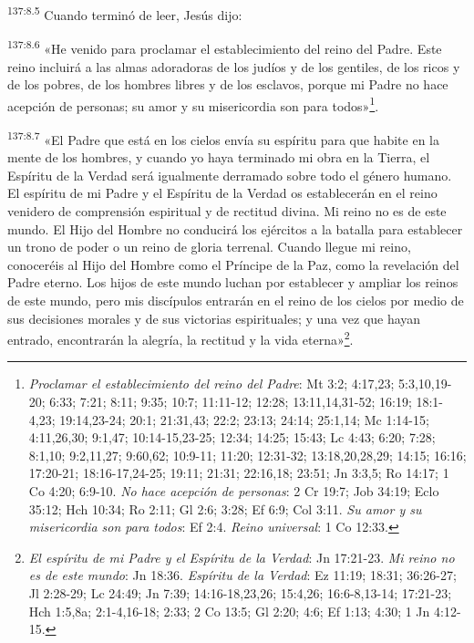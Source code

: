 \par 
\textsuperscript{137:8.5} Cuando terminó de leer, Jesús dijo:

\par 
\textsuperscript{137:8.6} «He venido para proclamar el establecimiento del reino del Padre. Este reino incluirá a las almas adoradoras de los judíos y de los gentiles, de los ricos y de los pobres, de los hombres libres y de los esclavos, porque mi Padre no hace acepción de personas; su amor y su misericordia son para todos»\footnote{\textit{Proclamar el establecimiento del reino del Padre}: Mt 3:2; 4:17,23; 5:3,10,19-20; 6:33; 7:21; 8:11; 9:35; 10:7; 11:11-12; 12:28; 13:11,14,31-52; 16:19; 18:1-4,23; 19:14,23-24; 20:1; 21:31,43; 22:2; 23:13; 24:14; 25:1,14; Mc 1:14-15; 4:11,26,30; 9:1,47; 10:14-15,23-25; 12:34; 14:25; 15:43; Lc 4:43; 6:20; 7:28; 8:1,10; 9:2,11,27; 9:60,62; 10:9-11; 11:20; 12:31-32; 13:18,20,28,29; 14:15; 16:16; 17:20-21; 18:16-17,24-25; 19:11; 21:31; 22:16,18; 23:51; Jn 3:3,5; Ro 14:17; 1 Co 4:20; 6:9-10. \textit{No hace acepción de personas}: 2 Cr 19:7; Job 34:19; Eclo 35:12; Hch 10:34; Ro 2:11; Gl 2:6; 3:28; Ef 6:9; Col 3:11. \textit{Su amor y su misericordia son para todos}: Ef 2:4. \textit{Reino universal}: 1 Co 12:33.}.

\par 
\textsuperscript{137:8.7} «El Padre que está en los cielos envía su espíritu para que habite en la mente de los hombres, y cuando yo haya terminado mi obra en la Tierra, el Espíritu de la Verdad será igualmente derramado sobre todo el género humano. El espíritu de mi Padre y el Espíritu de la Verdad os establecerán en el reino venidero de comprensión espiritual y de rectitud divina. Mi reino no es de este mundo. El Hijo del Hombre no conducirá los ejércitos a la batalla para establecer un trono de poder o un reino de gloria terrenal. Cuando llegue mi reino, conoceréis al Hijo del Hombre como el Príncipe de la Paz, como la revelación del Padre eterno. Los hijos de este mundo luchan por establecer y ampliar los reinos de este mundo, pero mis discípulos entrarán en el reino de los cielos por medio de sus decisiones morales y de sus victorias espirituales; y una vez que hayan entrado, encontrarán la alegría, la rectitud y la vida eterna»\footnote{\textit{El espíritu de mi Padre y el Espíritu de la Verdad}: Jn 17:21-23. \textit{Mi reino no es de este mundo}: Jn 18:36. \textit{Espíritu de la Verdad}: Ez 11:19; 18:31; 36:26-27; Jl 2:28-29; Lc 24:49; Jn 7:39; 14:16-18,23,26; 15:4,26; 16:6-8,13-14; 17:21-23; Hch 1:5,8a; 2:1-4,16-18; 2:33; 2 Co 13:5; Gl 2:20; 4:6; Ef 1:13; 4:30; 1 Jn 4:12-15.}.

